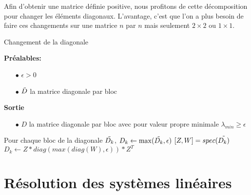 Afin d'obtenir une matrice d\'efinie positive, nous profitons de cette d\'ecomposition pour changer les \'el\'ements diagonaux.
L'avantage, c'est que l'on a plus besoin de faire ces changements sur une matrice $n$ par $n$ mais seulement $2\times2$ ou $1\times1$.

\begin{algorithm}                     %
\caption{Changement de la diagonale}          %
\label{alg:diag}                           %
\begin{algorithmic}
\STATE \textbf{Pr\'ealables:} %
\begin{itemize}
\item[$\bullet$] $\epsilon>0$
\item[$\bullet$] $\Tilde{D}$ la matrice diagonale par bloc
\end{itemize}
\STATE \textbf{Sortie} %
\begin{itemize}
\item[$\bullet$] $D$ la matrice diagonale par bloc avec pour valeur 
propre minimale $\lambda_{min} \geq \epsilon$
\end{itemize}

\STATE Pour chaque bloc de la diagonale $\Tilde{D_k}$,
\STATE $D_k\leftarrow \max(\Tilde{D_k},\epsilon)$
\ELSE 
\STATE $[Z,W]=spec(\Tilde{D_k)}$
\STATE $D_k\leftarrow Z*diag(max(diag(W),\epsilon))*Z^T$
\ENDIF
\end{algorithmic}
\end{algorithm}


% 



\section{R\'esolution des syst\`emes lin\'eaires}


